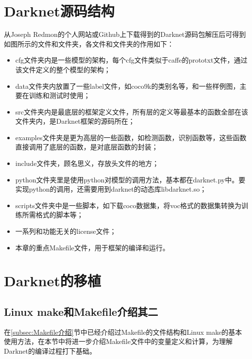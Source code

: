 \section{Darknet源码结构}
从Joseph Redmon的个人网站或Github上下载得到的Darknet源码包解压后可得到如图所示的文件和文件夹，各文件和文件夹的作用如下\cite{darknet_note}：
\begin{itemize}
	\item cfg文件夹内是一些模型的架构，每个cfg文件类似于caffe的prototxt文件，通过该文件定义的整个模型的架构；
	\item data文件夹内放置了一些label文件，如coco9k的类别名等，和一些样例图，主要在训练和测试时使用；
	\item src文件夹内是最底层的框架定义文件，所有层的定义等最基本的函数全部在该文件夹内，是Darknet框架的源码所在；
	\item examples文件夹是更为高层的一些函数，如检测函数，识别函数等，这些函数直接调用了底层的函数，是对底层函数的封装；
	\item include文件夹，顾名思义，存放头文件的地方；
	\item python文件夹里是使用python对模型的调用方法，基本都在darknet.py中。要实现python的调用，还需要用到darknet的动态库libdarknet.so；
	\item scripts文件夹中是一些脚本，如下载coco数据集，将voc格式的数据集转换为训练所需格式的脚本等；
	\item 一系列和功能无关的license文件；
	\item 本章的重点Makefile文件，用于框架的编译和运行。
\end{itemize}

\section{Darknet的移植}
\subsection{Linux make和Makefile介绍其二}
在\ref{subsec:Makefile介绍}节中已经介绍过Makefile的文件结构和Linux make的基本使用方法，在本节中将进一步介绍Makefile文件中的变量定义和计算，为理解Darknet的编译过程打下基础。

